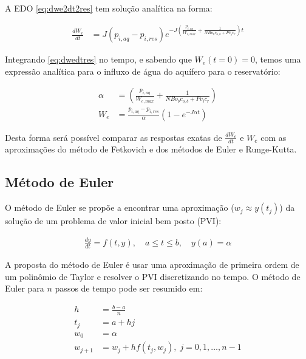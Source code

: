 \documentclass[final,5p]{elsarticle}
\numberwithin{equation}{section}
\begin{document}
        A EDO \ref{eq:dwe2dt2res} tem solução analítica na forma:

        \begin{align}
            \frac{dW_e}{dt} &= J (p_{i,aq} - p_{i,res}) e^{-J \left( \frac{p_{i,aq}}{W_{e,max}} + \frac{1}{N Bo_b c_{o,b} + Pv_i c_r} \right)  t} \label{eq:dwedtres}
        \end{align}

        Integrando \ref{eq:dwedtres} no tempo, e sabendo que $W_e(t=0)=0$, temos uma expressão analítica para o influxo de água do aquífero para o reservatório:

        \begin{align}
            \alpha &= \left( \frac{p_{i,aq}}{W_{e,max}} + \frac{1}{N Bo_b c_{o,b} + Pv_i c_r} \right) \nonumber \\
            W_e &= \frac{p_{i,aq} - p_{i,res}}{\alpha} \left( 1- e^{-J \alpha t} \right) \label{eq:wepres}
        \end{align}

        Desta forma será possível comparar as respostas exatas de $\frac{dW_e}{dt}$ e $W_e$ com as aproximações do método de Fetkovich e dos métodos de Euler e Runge-Kutta.

    \subsection{Método de Euler}

        O método de Euler se propõe a encontrar uma aproximação ($w_j \approx y(t_j)$) da solução de um problema de valor inicial bem posto (PVI):

        \begin{align}
            \frac{dy}{dt} = f(t,y), \quad a \leq t \leq b, \quad y(a) = \alpha \label{eq:pvi}
        \end{align}

       A proposta do método de Euler é usar uma aproximação de primeira ordem de um polinômio de Taylor e resolver o PVI discretizando no tempo. O método de Euler para $n$ passos de tempo pode ser resumido em:

        \begin{align}
            h &= \frac{b-a}{n} \nonumber \\
            t_j &= a + h j \nonumber \\
            w_0 &= \alpha \nonumber \\
            w_{j+1} &= w_{j} + h f(t_{j}, w_{j}), \; j=0,1,\ldots,n-1 \label{eq:euler}
        \end{align}
\end{document}
